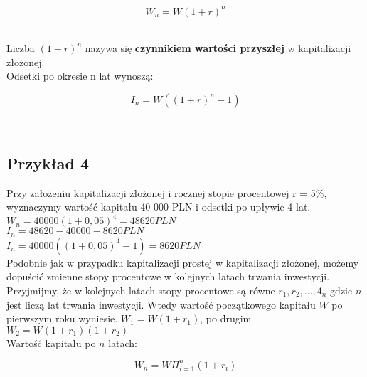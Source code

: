 \documentclass{article}
\begin{document}
\begin{center}
	\begin{equation}
		W_n = W(1+r)^n
	\end{equation}
\end{center}\\

Liczba $ (1+r)^n $ nazywa się \textbf{czynnikiem wartości przyszłej} w kapitalizacji złożonej.\\

Odsetki po okresie n lat wynoszą:\\

\begin{center}
	\begin{equation}
		I_n = W((1+r)^n - 1)
	\end{equation}
\end{center}\\

\subsection{Przykład 4}
Przy założeniu kapitalizacji złożonej i rocznej stopie procentowej r = 5\%, wyznaczymy wartość kapitału 40 000 PLN i odsetki po upływie 4 lat.\\

$ W_n = 40 000(1+ 0,05)^4 = 48 620 PLN $\\

$ I_n = 48 620 - 40 000 - 8 620 PLN $\\

$ I_n = 40 000((1 + 0,05)^4 - 1) = 8 620 PLN $\\

Podobnie jak w przypadku kapitalizacji prostej w kapitalizacji złożonej, możemy dopuścić zmienne stopy procentowe w kolejnych latach trwania inwestycji. Przyjmijmy, że w kolejnych latach stopy procentowe są równe $ r_1, r_2, ..., 4_n $ gdzie $ n $ jest liczą lat trwania inwestycji. Wtedy wartość początkowego kapitału $ W $ po pierwszym roku wyniesie. $ W_1 = W(1+r_1) $, po drugim $ W_2 = W(1+r_1)(1+r_2) $\\

Wartość kapitału po $ n $ latach: 

\begin{center}
	\begin{equation}
		W_n = W\Pi^n_{i=1}(1 + r_i)
	\end{equation}
\end{center}\\
\end{document}
